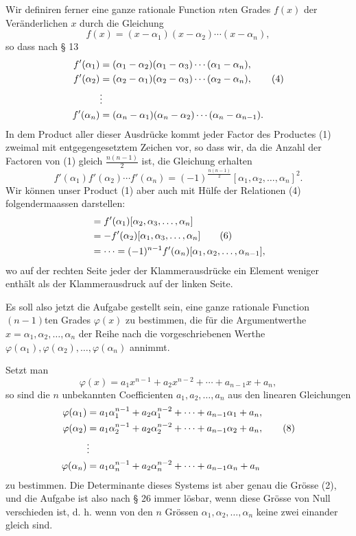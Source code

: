 \documentclass[11pt]{article}
\begin{document}
Wir definiren ferner eine ganze rationale Function $n$ten Grades $f(x)$ der Veränderlichen $x$ durch die Gleichung
\begin{equation}
 f(x)=(x-\alpha_1)(x-\alpha_2)\cdots(x-\alpha_n),\tag{3}
\end{equation}
so dass nach § 13
\begin{align}
 f'(\alpha_1)&=(\alpha_1-\alpha_2)(\alpha_1-\alpha_3)\cdots(\alpha_1-\alpha_n),\notag\\
 f'(\alpha_2)&=(\alpha_2-\alpha_1)(\alpha_2-\alpha_3)\cdots(\alpha_2-\alpha_n),\tag{4}\\
 &\vdots\notag\\
 f'(\alpha_n)&=(\alpha_n-\alpha_1)(\alpha_n-\alpha_2)\cdots(\alpha_n-\alpha_{n-1}).\notag
\end{align}
In dem Product aller dieser Ausdrücke kommt jeder Factor des Productes (1) zweimal mit entgegengesetztem Zeichen vor, so dass wir, da die Anzahl der Factoren von (1) gleich $\frac{n(n-1)}{2}$ ist, die Gleichung erhalten
\begin{equation}
 f'(\alpha_1)f'(\alpha_2)\cdots f'(\alpha_n)=(-1)^{\frac{n(n-1)}2}[\alpha_1,\alpha_2,\ldots,\alpha_n]^2.\tag{5}
\end{equation}
Wir können unser Product (1) aber auch mit Hülfe der Relationen (4) folgendermaassen darstellen:
\begin{align}
 [\alpha_1,\alpha_2,\ldots,\alpha_n]
 &= f'(\alpha_1)[\alpha_2,\alpha_3,\ldots,\alpha_n]\notag\\
 &=-f'(\alpha_2)[\alpha_1,\alpha_3,\ldots,\alpha_n]\tag{6}\\
 &=\cdots=(-1)^{n-1}f'(\alpha_n)[\alpha_1,\alpha_2,\ldots,\alpha_{n-1}],\notag
\end{align}
wo auf der rechten Seite jeder der Klammerausdrücke ein Element weniger enthält als der Klammerausdruck auf der linken Seite.

Es soll also jetzt die Aufgabe gestellt sein, eine ganze rationale Function $(n-1)$ten Grades $\varphi(x)$ zu bestimmen, die für die Argumentwerthe $x=\alpha_1,\alpha_2,\ldots,\alpha_n$ der Reihe nach die vorgeschriebenen Werthe $\varphi(\alpha_1),\varphi(\alpha_2),\ldots,\varphi(\alpha_n)$ annimmt.

Setzt man
\begin{equation}
 \varphi(x)=a_1x^{n-1}+a_2x^{n-2}+\cdots+a_{n-1}x+a_n,\tag{7}
\end{equation}
so sind die $n$ unbekannten Coefficienten $a_1,a_2,\ldots,a_n$ aus den linearen Gleichungen
\begin{align}
 \varphi(\alpha_1)&=a_1\alpha_1^{n-1}+a_2\alpha_1^{n-2}+\cdots+a_{n-1}\alpha_1+a_n,\notag\\
 \varphi(\alpha_2)&=a_1\alpha_2^{n-1}+a_2\alpha_2^{n-2}+\cdots+a_{n-1}\alpha_2+a_n,\tag{8}\\
 &\vdots\notag\\
 \varphi(\alpha_n)&=a_1\alpha_n^{n-1}+a_2\alpha_n^{n-2}+\cdots+a_{n-1}\alpha_n+a_n\notag
\end{align}
zu bestimmen. Die Determinante dieses Systems ist aber genau die Grösse (2), und die Aufgabe ist also nach § 26 immer lösbar, wenn diese Grösse von Null verschieden ist, d. h. wenn von den $n$ Grössen $\alpha_1,\alpha_2,\ldots,\alpha_n$ keine zwei einander gleich sind.
\end{document}
